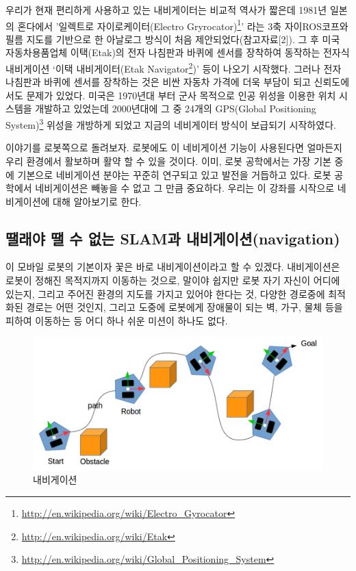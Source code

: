우리가 현재 편리하게 사용하고 있는 내비게이터는 비교적 역사가 짧은데 1981년 일본의 혼다에서 '일렉트로 자이로케이터(Electro Gryrocator)\footnote{\url{http://en.wikipedia.org/wiki/Electro_Gyrocator}}’ 라는 3축 자이ROS코프와 필름 지도를 기반으로 한 아날로그 방식이 처음 제안되었다(참고자료[2]). 그 후 미국 자동차용품업체 이택(Etak)의 전자 나침판과 바퀴에 센서를 장착하여 동작하는 전자식 내비게이션 ‘이택 내비게이터(Etak Navigator\footnote{\url{http://en.wikipedia.org/wiki/Etak}})’ 등이 나오기 시작했다. 그러나 전자 나침판과 바퀴에 센서를 장착하는 것은 비싼 자동차 가격에 더욱 부담이 되고 신뢰도에서도 문제가 있었다. 미국은 1970년대 부터 군사 목적으로 인공 위성을 이용한 위치 시스템을 개발하고 있었는데 2000년대에 그 중 24개의 GPS(Global Positioning System)\footnote{\url{http://en.wikipedia.org/wiki/Global_Positioning_System}} 위성을 개방하게 되었고 지금의 네비게이터 방식이 보급되기 시작하였다.

이야기를 로봇쪽으로 돌려보자. 로봇에도 이 네비게이션 기능이 사용된다면 얼마든지 우리 환경에서 활보하며 활약 할 수 있을 것이다. 이미, 로봇 공학에서는 가장 기본 중에 기본으로 네비게이션 분야는 꾸준히 연구되고 있고 발전을 거듭하고 있다. 로봇 공학에서 네비게이션은 빼놓을 수 없고 그 만큼 중요하다. 우리는 이 강좌를 시작으로 네비게이션에 대해 알아보기로 한다.

\subsection{땔래야 땔 수 없는 SLAM과 내비게이션(navigation)}

이 모바일 로봇의 기본이자 꽃은 바로 내비게이션이라고 할 수 있겠다. 내비게이션은 로봇이 정해진 목적지까지 이동하는 것으로, 말이야 쉽지만 로봇 자기 자신이 어디에 있는지, 그리고 주어진 환경의 지도를 가지고 있어야 한다는 것, 다양한 경로중에 최적화된 경로는 어떤 것인지, 그리고 도중에 로봇에게 장애물이 되는 벽, 가구, 물체 등을 피하여 이동하는 등 어디 하나 쉬운 미션이 하나도 없다. 

\begin{figure}[h]
\centering\includegraphics[width=0.8\columnwidth]{pictures/chapter11/navigation_concept.png}
\caption{내비게이션}
\end{figure}


